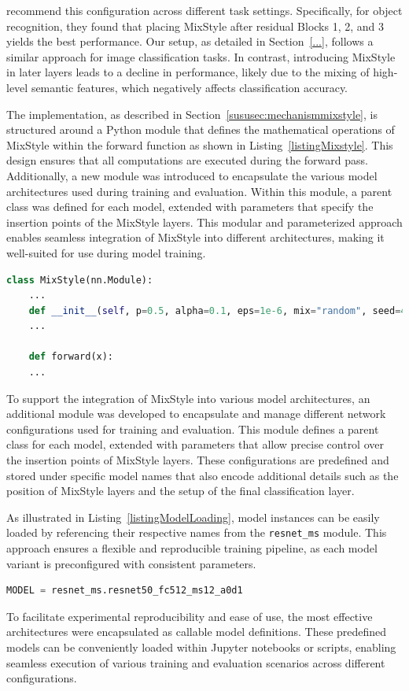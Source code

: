 \cite{mixstyle_ref} recommend this configuration across different task settings. Specifically, for object recognition, they found that placing MixStyle after residual Blocks 1, 2, and 3 yields the best performance. Our setup, as detailed in Section~\ref{...}, follows a similar approach for image classification tasks. In contrast, introducing MixStyle in later layers leads to a decline in performance, likely due to the mixing of high-level semantic features, which negatively affects classification accuracy.

The implementation, as described in Section~\ref{sususec:mechanismmixstyle}, is structured around a Python module that defines the mathematical operations of MixStyle within the forward function as shown in Listing~\ref{listingMixstyle}. This design ensures that all computations are executed during the forward pass. Additionally, a new module was introduced to encapsulate the various model architectures used during training and evaluation. Within this module, a parent class was defined for each model, extended with parameters that specify the insertion points of the MixStyle layers. This modular and parameterized approach enables seamless integration of MixStyle into different architectures, making it well-suited for use during model training.

\begin{lstlisting}[language=Python, caption={MixStyle implementation structure}, label=listingMixstyle]
class MixStyle(nn.Module):
	...
	def __init__(self, p=0.5, alpha=0.1, eps=1e-6, mix="random", seed=42):
	...
	
	def forward(x):
	...
\end{lstlisting}

To support the integration of MixStyle into various model architectures, an additional module was developed to encapsulate and manage different network configurations used for training and evaluation. This module defines a parent class for each model, extended with parameters that allow precise control over the insertion points of MixStyle layers. These configurations are predefined and stored under specific model names that also encode additional details such as the position of MixStyle layers and the setup of the final classification layer.

As illustrated in Listing~\ref{listingModelLoading}, model instances can be easily loaded by referencing their respective names from the \texttt{resnet\_ms} module. This approach ensures a flexible and reproducible training pipeline, as each model variant is preconfigured with consistent parameters.

\begin{lstlisting}[language=Python, caption={Model loading from predefined configurations}, label=listingModelLoading]
	MODEL = resnet_ms.resnet50_fc512_ms12_a0d1
\end{lstlisting}

To facilitate experimental reproducibility and ease of use, the most effective architectures were encapsulated as callable model definitions. These predefined models can be conveniently loaded within Jupyter notebooks or scripts, enabling seamless execution of various training and evaluation scenarios across different configurations. 
